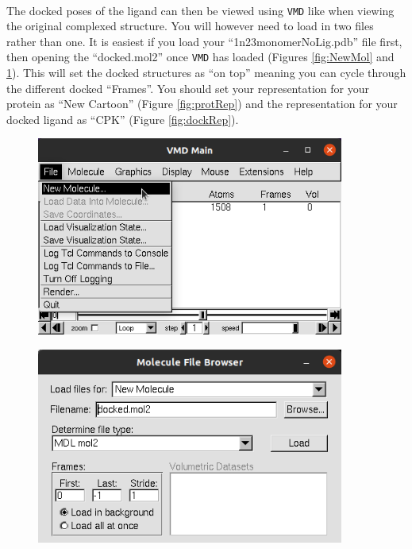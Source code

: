     \paragraph{}
    The docked poses of the ligand can then be viewed using \texttt{VMD} like when viewing the original complexed structure. You will however need to load in two files rather than one. It is easiest if you load your \enquote{1n23\textunderscore monomer\textunderscore NoLig.pdb} file first, then opening the \enquote{docked.mol2} once \texttt{VMD} has loaded (Figures \ref{fig:NewMol} and \ref{fig:LoadMol}). This will set the docked structures as \enquote{on top} meaning you can cycle through the different docked \enquote{Frames}. You should set your representation for your protein as \enquote{New Cartoon} (Figure \ref{fig:protRep}) and the representation for your docked ligand as \enquote{CPK} (Figure \ref{fig:dockRep}). 
        
    \begin{figure}[H]
        \centering
        \begin{minipage}{0.45\textwidth}
            \centering
            \includegraphics[width=0.9\textwidth]{Graphics/ScreenShots/NewMol.png}
            \label{fig:NewMol}
        \end{minipage}%
        \begin{minipage}{0.45\textwidth}
            \centering
            \includegraphics[width=0.9\textwidth]{Graphics/ScreenShots/docked_file.png}
            \label{fig:LoadMol}
        \end{minipage}
    \end{figure}

